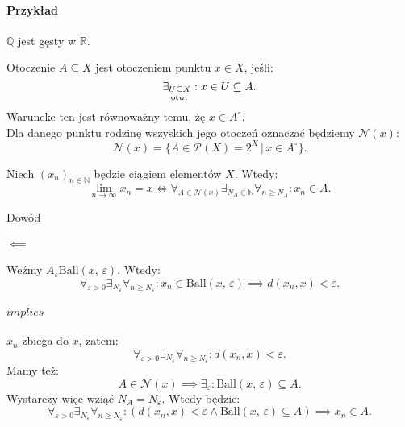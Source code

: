 \documentclass{article}
\numberwithin{defi}{section}
\numberwithin{theo}{section}
\numberwithin{defi}{section}
\newcommand{\R}{\mathbb{R}}
\newcommand{\N}{\mathbb{N}}
\newcommand{\Q}{\mathbb{Q}}
\newcommand{\oo}{\infty}
\newcommand{\eps}{\varepsilon}
\newcommand{\Nau}{\mathcal{N}}
\newcommand{\subotw}{\underset{\clap{\scriptsize otw.}}{\subseteq}}
\newcommand{\dg}{^{\circ}}
\newcommand{\ciag}[1]{(#1_{n})_{n \in \N}}
\newcommand{\ball}[2]{\text{Ball}(#1, \, #2)}
\begin{document}
\paragraph*{Przykład} $\Q$ jest gęsty w $\R$.

\begin{defr}{Otoczenie}
    $A \subseteq X$ jest otoczeniem punktu $x \in X$, jeśli: \begin{equation}
        \exists_{U \subotw X}: x \in U \subseteq A.
    \end{equation} Waruneke ten jest równoważny temu, żę $x \in A \dg$. \\
    Dla danego punktu rodzinę wszyskich jego otoczeń oznaczać będziemy $\Nau (x)$: \begin{equation}
        \Nau (x) = \{ A \in \mathcal{P}(X) = 2^X \, \big| \, x \in A\dg \}.
    \end{equation}
\end{defr}

\begin{twier}{}
    Niech $\ciag{x}$ będzie ciągiem elementów $X$. Wtedy:\begin{equation}
        \lim_{n \to \oo} x_n = x \iff \forall_{A \in \Nau(x)} \exists_{N_A \in \N} \forall_{n \geqslant N_A}: x_n \in A.
    \end{equation}
\end{twier}

\begin{dow}{Dowód}
    \paragraph{$\impliedby$} Weźmy $A_\eps  \ball{x}{\eps}$. Wtedy:\begin{equation}
        \forall_{\eps >0} \exists_{N_\eps} \forall_{n \geqslant N_\eps}: x_n \in \ball{x}{\eps} \implies d(x_n, x) < \eps.
    \end{equation}
    \paragraph{$implies$} $x_n$ zbiega do $x$, zatem: \begin{equation*}
        \forall_{\eps >0} \exists_{N_\eps} \forall_{n \geqslant N_\eps}: d(x_n, x) < \eps.
    \end{equation*} Mamy też: \begin{equation*}
        A \in \Nau(x) \implies \exists_\eps: \ball{x}{\eps} \subseteq A.
    \end{equation*} Wystarczy więc wziąć $N_A = N_\eps$. Wtedy będzie: \begin{equation}
        \forall_{\eps >0} \exists_{N_\eps} \forall_{n \geqslant N_\eps}: (d(x_n, x) < \eps \wedge \ball{x}{\eps} \subseteq A) \implies x_n \in A.
    \end{equation}
\end{dow}
\end{document}

